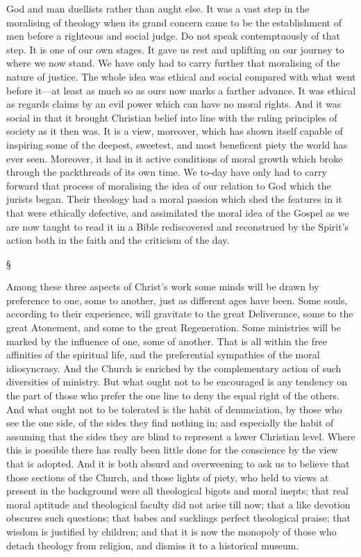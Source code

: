 \documentclass[12pt,letterpaper,oneside]{book}
\begin{document}
God and man duellists rather than aught else. 
It was a vast step in the moralising of theology 
when its grand concern came to be the establishment 
of men before a righteous and social 
judge. Do not speak contemptuously of that 
step. It is one of our own stages. It gave us 
rest and uplifting on our journey to where we 
now stand. We have only had to carry further 
that moralising of the nature of justice. The 
whole idea was ethical and social compared 
with what went before it---at least as much so 
as ours now marks a farther advance. It was 
ethical as regards claims by an evil power which 
can have no moral rights. And it was social 
in that it brought Christian belief into line 
with the ruling principles of society as it then 
was. It is a view, moreover, which has shown 
itself capable of inspiring some of the deepest, 
sweetest, and most beneficent piety the world 
has ever seen. Moreover, it had in it active 
conditions of moral growth which broke 
through the packthreads of its own time. 
We to-day have only had to carry forward 
that process of moralising the idea of our relation 
to God which the jurists began. Their 
theology had a moral passion which shed the 
features in it that were ethically defective, and 
assimilated the moral idea of the Gospel as 
we are now taught to read it in a Bible rediscovered 
and reconstrued by the Spirit's action 
both in the faith and the criticism of the day. 

\begin{center}
\S
\end{center}

Among these three aspects of Christ's work 
some minds will be drawn by preference to 
one, some to another, just as different ages 
have been. Some souls, according to their experience, 
will gravitate to the great Deliverance, 
some to the great Atonement, and some to the 
great Regeneration. Some ministries will be 
marked by the influence of one, some of 
another. That is all within the free affinities 
of the spiritual life, and the preferential sympathies 
of the moral idiosyncrasy. And the 
Church is enriched by the complementary 
action of such diversities of ministry. But 
what ought not to be encouraged is any tendency 
on the part of those who prefer the 
one line to deny the equal right of the others. 
And what ought not to be tolerated is the 
habit of denunciation, by those who see the 
one side, of the sides they find nothing in; and 
especially the habit of assuming that the sides 
they are blind to represent a lower Christian 
level. Where this is possible there has really 
been little done for the conscience by the view 
that is adopted. And it is both absurd and overweening 
to ask us to believe that those sections 
of the Church, and those lights of piety, who 
held to views at present in the background were 
all theological bigots and moral inepts; that 
real moral aptitude and theological faculty did 
not arise till now; that a like devotion obscures 
such questions; that babes and sucklings perfect 
theological praise; that wisdom is justified 
by children; and that it is now the monopoly 
of those who detach theology from religion, and 
dismiss it to a historical museum. 
\end{document}
